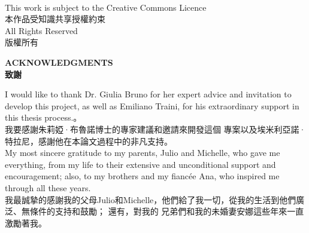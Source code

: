 \documentclass[12pt,a4paper]{report}  %
\begin{document}
\begin{center}
\fontsize{12}{22}\selectfont {Academic Year 2020 – 2021}\\
\fontsize{12}{22}\selectfont {2020 – 2021 學年}
\end{center}
\thispagestyle{empty}
\newpage
\vspace*{\fill}
\vspace*{\fill}
\begin{raggedright}
    \fontsize{12}{14}\selectfont This work is subject to the Creative Commons Licence\\
    \fontsize{12}{14}\selectfont 本作品受知識共享授權約束\\[2ex]
    \fontsize{12}{12}\selectfont All Rights Reserved\\
    \fontsize{12}{12}\selectfont 版權所有\\

\end{raggedright}
\thispagestyle{empty}
\newpage
\setcounter{page}{2}

\begin{center}
 \fontsize{18}{16}\selectfont \textbf{ACKNOWLEDGMENTS}\\
\fontsize{18}{16}\selectfont \textbf{致謝}\par
\end{center}

\fontsize{14pt}{2.5pt}\sectionef
  {  I would like to thank Dr. Giulia Bruno for her expert advice and invitation to develop this project, as well as Emiliano Traini, for his extraordinary support in this thesis process.}。\\[1pt]

\fontsize{14pt}{5pt}\sectionef
  {  我要感謝朱莉婭·布魯諾博士的專家建議和邀請來開發這個
專案以及埃米利亞諾·特拉尼，感謝他在本論文過程中的非凡支持。}\\[15pt]

\fontsize{14pt}{2.5pt}\sectionef
  {  My most sincere gratitude to my parents, Julio and Michelle, who gave me everything, 
from my life to their extensive and unconditional support and encouragement; also, to my 
brothers and my fiancée Ana, who inspired me through all these years.}\\[1pt]

\fontsize{14pt}{5pt}\sectionef
  {  我最誠摯的感謝我的父母Julio和Michelle，他們給了我一切，從我的生活到他們廣泛、無條件的支持和鼓勵； 還有，對我的
兄弟們和我的未婚妻安娜這些年來一直激勵著我。}\\[15pt]
\end{document}
